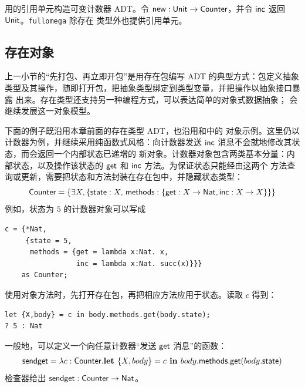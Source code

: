 \begin{exercise}
\label{ex:24.2.2}
用的引用单元构造可变计数器 ADT。令
\(\mathsf{new}:\mathsf{Unit}\to\mathsf{Counter}\)，并令
\(\mathsf{inc}\) 返回 \(\mathsf{Unit}\)。\texttt{fullomega} 除存在
类型外也提供引用单元。
\end{exercise}

\subsection*{存在对象}

上一小节的“先打包、再立即开包”是用存在包编写 ADT 的典型方式：包定义抽象
类型及其操作，随即打开包，把抽象类型绑定到类型变量，并把操作以抽象接口暴露
出来。存在类型还支持另一种编程方式，可以表达简单的对象式数据抽象；
会继续发展这一对象模型。

下面的例子既沿用本章前面的存在类型 ADT，也沿用和中的
对象示例。这里仍以计数器为例，并继续采用纯函数式风格：向计数器发送
\(\mathsf{inc}\) 消息不会就地修改其状态，而会返回一个内部状态已递增的
新对象。计数器对象包含两类基本分量：内部状态，以及操作该状态的
\(\mathsf{get}\) 和 \(\mathsf{inc}\) 方法。为保证状态只能经由这两个
方法查询或更新，需要把状态和方法封装在存在包中，并隐藏状态类型：
\[
\mathsf{Counter}
=\{\exists X,
\{\mathsf{state}:X,\,
 \mathsf{methods}:
 \{\mathsf{get}:X\to\mathsf{Nat},
   \mathsf{inc}:X\to X\}\}\}
\]
例如，状态为 \(5\) 的计数器对象可以写成
\begin{lstlisting}
c = {*Nat,
     {state = 5,
      methods = {get = lambda x:Nat. x,
                 inc = lambda x:Nat. succ(x)}}}
    as Counter;
\end{lstlisting}
使用对象方法时，先打开存在包，再把相应方法应用于状态。读取 \(c\) 得到：
\begin{lstlisting}
let {X,body} = c in body.methods.get(body.state);
? 5 : Nat
\end{lstlisting}
一般地，可以定义一个向任意计数器“发送 \(\mathsf{get}\) 消息”的函数：
\[
\mathsf{sendget}
=\lambda c:\mathsf{Counter}.
\textbf{let }\{X,body\}=c\textbf{ in }
body.\mathsf{methods}.\mathsf{get}(body.\mathsf{state})
\]
检查器给出 \(\mathsf{sendget}:\mathsf{Counter}\to\mathsf{Nat}\)。

